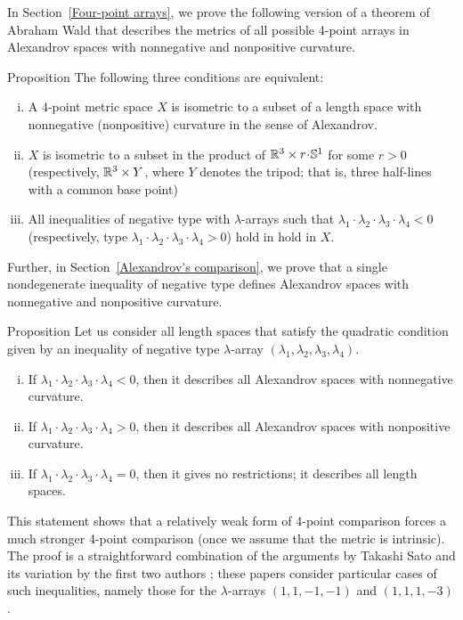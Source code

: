 \documentclass[a4paper,10pt]{article}
\begin{document}
In Section~\ref{Four-point arrays}, we prove the following version of a theorem of Abraham Wald \cite[§ 7]{wald} that describes the metrics of all possible 4-point arrays in Alexandrov spaces with nonnegative and nonpositive curvature.

\begin{thm}{Proposition}
The following three conditions are equivalent:
\begin{enumerate}[(i)]
\item A 4-point metric space $X$ is isometric to a subset of a length space with nonnegative (nonpositive) curvature in the sense of Alexandrov.
\item $X$ is isometric to a subset in the product of $\RR^3\times r\cdot \SSS^1$ for some $r>0$ (respectively, $\mathbb{R}^3\times Y$, where $Y$ denotes the tripod; that is, three half-lines with a common base point)
\item All inequalities of negative type with $\lambda$-arrays such that $\lambda_1\cdot\lambda_2\cdot\lambda_3\cdot\lambda_4<0$ (respectively, type $\lambda_1\cdot\lambda_2\cdot\lambda_3\cdot\lambda_4>0$) hold in hold in $X$.
\end{enumerate}
\end{thm}

Further, in Section~\ref{Alexandrov's comparison}, we prove that a single nondegenerate inequality of negative type defines Alexandrov spaces with nonnegative and nonpositive curvature.

\begin{thm}{Proposition}
Let us consider all length spaces that satisfy the quadratic condition given by an inequality of negative type $\lambda$-array $(\lambda_1,\lambda_2,\lambda_3,\lambda_4)$.
\begin{enumerate}[(i)]
\item If $\lambda_1\cdot\lambda_2\cdot\lambda_3\cdot\lambda_4<0$, then it describes all Alexandrov spaces with nonnegative curvature.
\item If $\lambda_1\cdot\lambda_2\cdot\lambda_3\cdot\lambda_4>0$, then it describes all Alexandrov spaces with nonpositive curvature.
\item If $\lambda_1\cdot\lambda_2\cdot\lambda_3\cdot\lambda_4=0$, then it gives no restrictions; it describes all length spaces.
\end{enumerate}

\end{thm}

This statement shows that a relatively weak form of 4-point comparison forces a much stronger 4-point comparison (once we assume that the metric is intrinsic).
The proof is a straightforward combination of the arguments by Takashi Sato \cite{sato} and its variation by the first two authors \cite{lebedeva-petrunin-2010};
these papers consider particular cases of such inequalities, namely those for the $\lambda$-arrays $(1,1,-1,-1)$ and $(1,1,1,-3)$.
\end{document}

